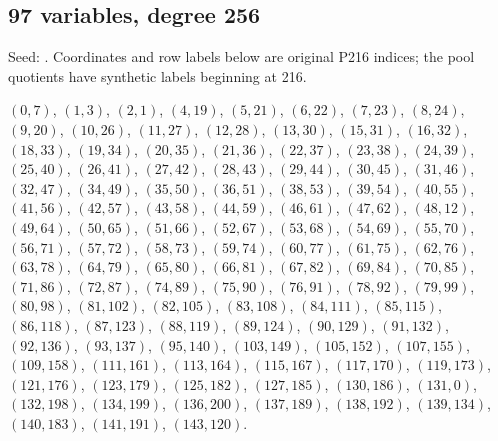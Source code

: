 \documentclass[11pt]{article}
\theoremstyle{definition}\newtheorem{definition}[theorem]{Definition}
\newcommand{\code}[1]{\texttt{\detokenize{#1}}}
\begin{document}
\subsection*{97 variables, degree 256}
Seed: \code{source207.json}. Coordinates and row labels below are original P216 indices; the pool quotients have synthetic labels beginning at 216.
{\small\raggedright
$(0,7)$, $(1,3)$, $(2,1)$, $(4,19)$, $(5,21)$, $(6,22)$, $(7,23)$, $(8,24)$, $(9,20)$, $(10,26)$, $(11,27)$, $(12,28)$, $(13,30)$, $(15,31)$, $(16,32)$, $(18,33)$, $(19,34)$, $(20,35)$, $(21,36)$, $(22,37)$, $(23,38)$, $(24,39)$, $(25,40)$, $(26,41)$, $(27,42)$, $(28,43)$, $(29,44)$, $(30,45)$, $(31,46)$, $(32,47)$, $(34,49)$, $(35,50)$, $(36,51)$, $(38,53)$, $(39,54)$, $(40,55)$, $(41,56)$, $(42,57)$, $(43,58)$, $(44,59)$, $(46,61)$, $(47,62)$, $(48,12)$, $(49,64)$, $(50,65)$, $(51,66)$, $(52,67)$, $(53,68)$, $(54,69)$, $(55,70)$, $(56,71)$, $(57,72)$, $(58,73)$, $(59,74)$, $(60,77)$, $(61,75)$, $(62,76)$, $(63,78)$, $(64,79)$, $(65,80)$, $(66,81)$, $(67,82)$, $(69,84)$, $(70,85)$, $(71,86)$, $(72,87)$, $(74,89)$, $(75,90)$, $(76,91)$, $(78,92)$, $(79,99)$, $(80,98)$, $(81,102)$, $(82,105)$, $(83,108)$, $(84,111)$, $(85,115)$, $(86,118)$, $(87,123)$, $(88,119)$, $(89,124)$, $(90,129)$, $(91,132)$, $(92,136)$, $(93,137)$, $(95,140)$, $(103,149)$, $(105,152)$, $(107,155)$, $(109,158)$, $(111,161)$, $(113,164)$, $(115,167)$, $(117,170)$, $(119,173)$, $(121,176)$, $(123,179)$, $(125,182)$, $(127,185)$, $(130,186)$, $(131,0)$, $(132,198)$, $(134,199)$, $(136,200)$, $(137,189)$, $(138,192)$, $(139,134)$, $(140,183)$, $(141,191)$, $(143,120)$.\par}
\end{document}
